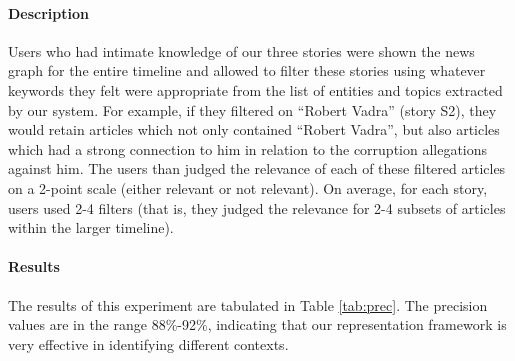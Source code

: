 \normalsize

\paragraph*{Description} Users who had intimate knowledge of our three stories were shown the news graph for the entire timeline and allowed to filter these stories using whatever keywords they felt were appropriate from the list of entities and topics extracted by our system. For example, if they filtered on ``Robert Vadra'' (story S2), they would retain articles which not only contained ``Robert Vadra'', but also articles which had a strong connection to him in relation to the corruption allegations against him. The users than judged the relevance of each of these filtered articles on a 2-point scale (either relevant or not relevant). On average, for each story, users used 2-4 filters (that is, they judged the relevance for 2-4 subsets of articles within the larger timeline).

\paragraph*{Results} The results of this experiment are tabulated in Table \ref{tab:prec}. The precision values are in the range 88\%-92\%, indicating that our representation framework is very effective in identifying different contexts.

